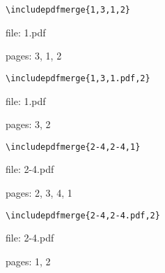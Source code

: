 \documentclass[a4paper]{article}
\begin{document}
\verb|\includepdfmerge{1,3,1,2}|\par
file: 1.pdf\par
pages: 3, 1, 2


\verb|\includepdfmerge{1,3,1.pdf,2}|\par
file: 1.pdf\par
pages: 3, 2

\verb|\includepdfmerge{2-4,2-4,1}|\par
file: 2-4.pdf\par
pages: 2, 3, 4, 1

\verb|\includepdfmerge{2-4,2-4.pdf,2}|\par
file: 2-4.pdf\par
pages: 1, 2
\end{document}

